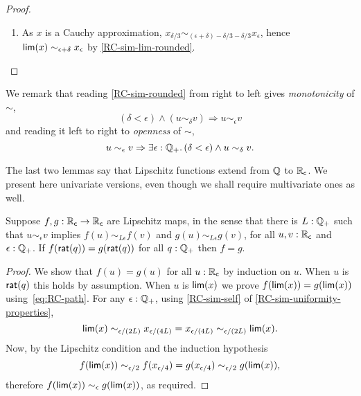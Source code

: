 \begin{proof}
\begin{enumerate}
  \item As $x$ is a Cauchy approximation, $x_{\delta/3} \sim_{(\epsilon + \delta) -
      \delta/3 - \delta/3} x_\epsilon$, hence $\mathsf{lim}(x) \sim_{\epsilon + \delta}
    x_\epsilon$ by \autoref{RC-sim-lim-rounded}.
  \end{enumerate}
\end{proof}

\noindent
We remark that reading \autoref{RC-sim-rounded} from right to left gives
\emph{monotonicity} of $\sim$,
%
\begin{equation*}
  (\delta < \epsilon) \land (u \sim_\delta v) \Rightarrow u \sim_\epsilon v
\end{equation*}
%
and reading it left to right to \emph{openness} of $\sim$,
%
\begin{equation*}
  u \sim_\epsilon v \Rightarrow \exis{\epsilon : \Qp} (\delta < \epsilon) \land u \sim_\delta v.
\end{equation*}

The last two lemmas say that Lipschitz functions extend from $\mathbb{Q}$ to $\mathbb{R}_\mathsf{c}$. We present
here univariate versions, even though we shall require multivariate ones as well.

\begin{lem} \label{RC-Lipschitz-eq}
  Suppose $f,g : \mathbb{R}_\mathsf{c} \to \mathbb{R}_\mathsf{c}$ are Lipschitz maps, in the sense that there is $L : \mathbb{Q}_{+}$
  such that $u \sim_\epsilon v$ implies $f(u) \sim_{L \epsilon} f(v)$ and $g(u) \sim_{L
    \epsilon} g(v)$, for all $u, v : \mathbb{R}_\mathsf{c}$ and $\epsilon : \mathbb{Q}_{+}$. If $f(\mathsf{rat}(q)) =
  g(\mathsf{rat}(q))$ for all $q : \mathbb{Q}_{+}$ then $f = g$.
\end{lem}

\begin{proof}
  We show that $f(u) = g(u)$ for all $u : \mathbb{R}_\mathsf{c}$ by induction on $u$. When $u$ is
  $\mathsf{rat}(q)$ this holds by assumption. When $u$ is $\mathsf{lim}(x)$ we prove $f(\mathsf{lim}(x)) =
  g(\mathsf{lim}(x))$ using~\eqref{eq:RC-path}. For any $\epsilon : \mathbb{Q}_{+}$, using
  \autoref{RC-sim-self} of \autoref{RC-sim-uniformity-properties},
  \begin{equation*}
    \mathsf{lim}(x) \sim_{\epsilon/(2 L)}
    x_{\epsilon/(4 L)} =
    x_{\epsilon/(4 L)} \sim_{\epsilon/(2 L)}
    \mathsf{lim}(x).
  \end{equation*}
  Now, by the Lipschitz condition and the induction hypothesis
  \begin{equation*}
    f(\mathsf{lim}(x)) \sim_{\epsilon/2}
    f(x_{\epsilon/4}) =
    g(x_{\epsilon/4}) \sim_{\epsilon/2}
    g(\mathsf{lim}(x)),
  \end{equation*}
  therefore $f(\mathsf{lim}(x)) \sim_\epsilon g(\mathsf{lim}(x))$, as required.
\end{proof}


